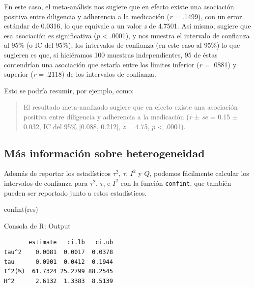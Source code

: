 \documentclass[
  bookmarksnumbered]{article}
\newenvironment{Shaded}{\begin{snugshade}}{\end{snugshade}}
\newcommand{\FunctionTok}[1]{\textcolor[rgb]{0.39,0.29,0.61}{#1}}
\newcommand{\NormalTok}[1]{\textcolor[rgb]{0.12,0.11,0.11}{#1}}
\begin{document}
En este caso, el meta-análisis nos sugiere que en efecto existe una asociación positiva entre diligencia y adherencia a la medicación (\emph{r} = .1499), con un error estándar de 0.0316, lo que equivale a un valor \emph{z} de 4.7501. Así mismo, sugiere que esa asociación es significativa (\(p\) \textless{} .0001), y nos muestra el intervalo de confianza al 95\% (o IC del 95\%); los intervalos de confianza (en este caso al 95\%) lo que sugieren es que, si hiciéramos 100 muestras independientes, 95 de éstas contendrían una asociación que estaría entre los límites inferior (\emph{r} = .0881) y superior (\emph{r} = .2118) de los intervalos de confianza.

Esto se podría resumir, por ejemplo, como:

\begin{quote}
El resultado meta-analizado sugiere que en efecto existe una asociación positiva entre diligencia y adherencia a la medicación (\emph{r} ± \emph{se} = 0.15 ± 0.032, IC del 95\% {[}0.088, 0.212{]}, \emph{z} = 4.75, \(p\) \textless{} .0001).
\end{quote}

\hypertarget{muxe1s-informaciuxf3n-sobre-heterogeneidad}{%
\subsection{Más información sobre heterogeneidad}\label{muxe1s-informaciuxf3n-sobre-heterogeneidad}}

Además de reportar los estadísticos \(\tau^2\), \(\tau\), \(I^2\) y \(Q\), podemos fácilmente calcular los intervalos de confianza para \(\tau^2\), \(\tau\), e \(I^2\) con la función \texttt{confint}, que también pueden ser reportado junto a estos estadísticos.

\begin{Shaded}
\begin{Highlighting}[]
\FunctionTok{confint}\NormalTok{(res)}
\end{Highlighting}
\end{Shaded}

\begin{ROut}{Consola de R: Output~\thetcbcounter}
                \begin{footnotesize}
                \begin{verbatim} 
       estimate   ci.lb   ci.ub 
tau^2    0.0081  0.0017  0.0378 
tau      0.0901  0.0412  0.1944 
I^2(%)  61.7324 25.2799 88.2545 
H^2      2.6132  1.3383  8.5139 
 \end{verbatim}
                \end{footnotesize}
                \end{ROut}
\end{document}
